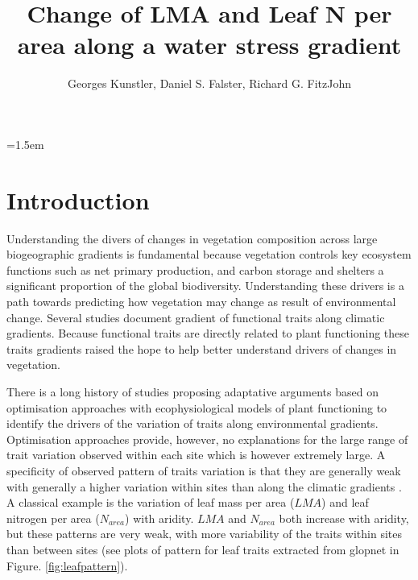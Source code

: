 \documentclass[a4paper,11pt]{article}
\title{Change of LMA and Leaf N per area along a water stress gradient}
\author{Georges Kunstler, Daniel S. Falster, Richard G. FitzJohn}
\date{}
\affiliation{INRAE, Grenoble, France and Department of Biological Sciences, Macquarie University,
  Sydney, Australia}
\date{}
\begin{document}
\mstitleshort
\parindent=1.5em
\addtolength{\parskip}{.3em}


\section{Introduction}

Understanding the divers of changes in vegetation composition across large biogeographic gradients is fundamental because vegetation controls key ecosystem functions such as net primary production, and carbon storage and shelters a significant proportion of the global biodiversity. Understanding these drivers is a path towards predicting how vegetation may change as result of environmental change. Several studies document gradient of functional traits along climatic
gradients. Because functional traits are directly related to plant
functioning these traits gradients raised the hope to help better
understand drivers of changes in vegetation.

There is a long history of studies
proposing adaptative arguments based on optimisation approaches with
ecophysiological models of plant functioning \citep{Makela-2002} to
identify the drivers of the variation of traits along environmental
gradients.
Optimisation approaches provide, however, no explanations for the large range of trait variation observed
within each site which is however extremely large. A specificity of observed pattern of traits variation is
that they are generally weak with generally a higher variation within
sites than along the climatic gradients \citep[see][]{Wright-2004}. A
classical example is the variation of leaf mass per area ($LMA$) and
leaf nitrogen per area ($N_{area}$) with aridity. $LMA$
\citep{Wright-2004,Onoda-2011,Moles-2014} and $N_{area}$
\citep{Wright-2005,Maire-2015} both increase with aridity, but these
patterns are very weak, with more variability of the traits within
sites than between sites (see plots of pattern for leaf traits extracted from glopnet \citep{Wright-2004} in Figure. \ref{fig:leafpattern}).
\end{document}
